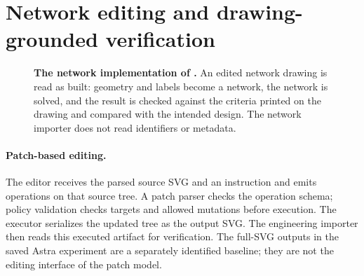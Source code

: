 \section{Network editing and drawing-grounded verification}
\label{sec:method}

\begin{figure}[t]
\centering
{}
\caption{\textbf{The network implementation of \ours.} An edited network drawing is read as built: geometry and labels become a network, the
network is solved, and the result is checked against the criteria printed on the drawing and compared with
the intended design. The network importer does not read identifiers or metadata.}
\label{fig:pipeline}
\end{figure}

\paragraph{Patch-based editing.} The editor receives the parsed source SVG and an instruction and emits
operations on that source tree. A patch parser checks the operation schema; policy validation checks
targets and allowed mutations before execution. The executor serializes the updated tree as the output
SVG. The engineering importer then reads this executed artifact for verification. The full-SVG outputs
in the saved Astra experiment are a separately identified baseline; they are not the editing interface
of the patch model.

